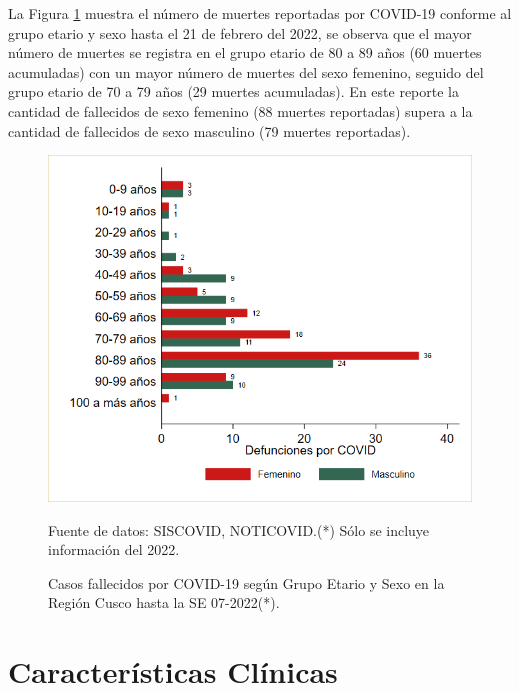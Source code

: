 \documentclass[12pt,a4paper,openany]{book}
\begin{document}
La Figura \ref{fig:fallecidos_edad_sexo}  muestra el número de muertes reportadas por COVID-19 conforme al grupo etario y sexo hasta el 21 de febrero del 2022, se observa que el mayor número de muertes se registra en el grupo etario de 80 a 89 años (60 muertes acumuladas) con un mayor número de muertes del sexo femenino, seguido del grupo etario de 70 a 79 años (29 muertes acumuladas). En este reporte la cantidad de fallecidos de sexo femenino (88 muertes reportadas) supera a la cantidad de fallecidos de sexo masculino (79 muertes reportadas). 

\begin{figure}[h]
	\caption{Casos fallecidos por COVID-19 según Grupo Etario y Sexo en la Región Cusco hasta la SE 07-2022(*).}\label{fig:fallecidos_edad_sexo}
	\begin{center}
		\includegraphics[width=0.75\linewidth]{../figuras/defunciones_etapavida_2022}
	\end{center}
	{\footnotesize {Fuente de datos: SISCOVID, NOTICOVID.(*) Sólo se incluye información del 2022.}}
\end{figure}



\cleardoublepage


\clearpage

\section*{Características Clínicas}
\end{document}
